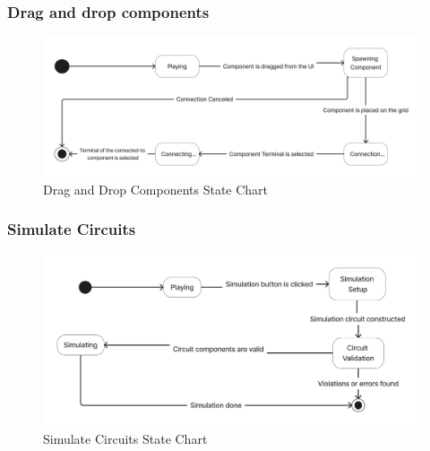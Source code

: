 \documentclass[../main.tex]{subfiles}
\begin{document}
\subsubsection{Drag and drop components}

\begin{figure}[h!]
\centering
\includegraphics[scale=0.1]{images/chapter3/stateChart1.png}
\caption{Drag and Drop Components State Chart}
\label{Drag And Drop Components State Chart}
\end{figure}

\subsubsection{Simulate Circuits}
\begin{figure}[h!]
\centering
\includegraphics[scale=0.1]{images/chapter3/StateChart2.png}
\caption{Simulate Circuits State Chart}
\label{Simulate Circuits State Chart}
\end{figure}
\vfill
\newpage
\end{document}
